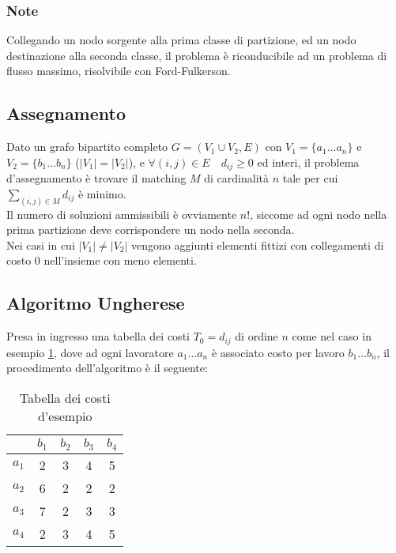 \documentclass[../template]{subfiles}
\begin{document}
\subsubsection{Note}
Collegando un nodo sorgente alla prima classe di partizione, ed un nodo destinazione alla seconda classe, il problema è riconducibile ad un
problema di flusso massimo, risolvibile con Ford-Fulkerson.

\subsection{Assegnamento}
Dato un grafo bipartito completo $G = (V_1 \cup V_2, E)$ con $V_1 = \{a_1 \dots a_n\}$ e $V_2 = \{b_1 \dots b_n\}$ ($|V_1| = |V_2|$),
e $\forall (i, j) \in E \quad d_{ij} \ge 0$ ed interi,
il problema d'assegnamento è trovare il matching $M$ di cardinalità $n$ tale per cui
$\sum_{(i, j) \in M} d_{ij}$ è minimo.
\\[10pt]
Il numero di soluzioni ammissibili è ovviamente $n!$, siccome ad ogni nodo nella prima
partizione deve corrispondere un nodo nella seconda.
\\
Nei casi in cui $|V_1| \neq |V_2|$ vengono aggiunti elementi fittizi con collegamenti di costo 0 nell'insieme con meno elementi.

\subsection{Algoritmo Ungherese}

Presa in ingresso una tabella dei costi $T_0 = d_{ij}$ di ordine $n$ come nel caso in esempio
\ref{tab:hungarian_example}, dove ad ogni lavoratore $a_1 \dots a_n$ è associato costo per lavoro $b_1 \dots b_n$, il
procedimento dell'algoritmo è il seguente:

\begin{table}[h]
    \centering
    \begin{tabular}{|c|cccc|}
        \hline
    & $b_1$ & $b_2$ & $b_3$ & $b_4$\\
    \hline
        $a_1$ & 2 & 3 & 4 & 5\\
        $a_2$ & 6 & 2 & 2 & 2\\
        $a_3$ & 7 & 2 & 3 & 3\\
        $a_4$ & 2 & 3 & 4 & 5\\
        \hline
    \end{tabular}
    \caption{Tabella dei costi d'esempio}
    \label{tab:hungarian_example}
\end{table}
\end{document}

